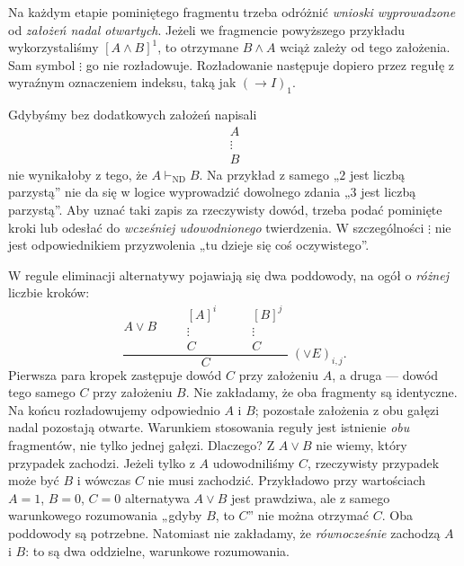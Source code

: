 \begin{uwaga}
Na każdym etapie pominiętego fragmentu trzeba odróżnić
\emph{wnioski wyprowadzone} od \emph{założeń nadal otwartych}.
Jeżeli we fragmencie powyższego przykładu wykorzystaliśmy
$[A\land B]^1$, to otrzymane $B\land A$ wciąż zależy
od tego założenia. Sam symbol $\vdots$ go nie rozładowuje.
Rozładowanie następuje dopiero przez regułę z wyraźnym
oznaczeniem indeksu, taką jak $(\to I)_1$.
\end{uwaga}

\begin{przyklad}
Gdybyśmy bez dodatkowych założeń napisali
\[
\begin{array}{c}
A\\
\vdots\\
B
\end{array}
\]
nie wynikałoby z tego, że $A\vdash_{\mathrm{ND}}B$.
Na przykład z samego „$2$ jest liczbą parzystą”
nie da się w logice wyprowadzić dowolnego zdania
„$3$ jest liczbą parzystą”. Aby uznać taki zapis
za rzeczywisty dowód, trzeba podać pominięte kroki
lub odesłać do \emph{wcześniej udowodnionego} twierdzenia.
W szczególności $\vdots$ nie jest odpowiednikiem
przyzwolenia „tu dzieje się coś oczywistego”.
\end{przyklad}

\begin{przyklad}
W regule eliminacji alternatywy pojawiają się dwa
poddowody, na ogół o \emph{różnej} liczbie kroków:
\[
\frac{A\lor B\qquad
  \begin{array}{c}[A]^i\\\vdots\\ C\end{array}
  \qquad
  \begin{array}{c}[B]^j\\\vdots\\ C\end{array}
}{C}\;(\lor E)_{i,j}.
\]
Pierwsza para kropek zastępuje dowód $C$ przy założeniu $A$,
a druga --- dowód tego samego $C$ przy założeniu $B$.
Nie zakładamy, że oba fragmenty są identyczne.
Na końcu rozładowujemy odpowiednio $A$ i $B$;
pozostałe założenia z obu gałęzi nadal pozostają otwarte.
Warunkiem stosowania reguły jest istnienie \emph{obu}
fragmentów, nie tylko jednej gałęzi.
Dlaczego? Z $A\lor B$ nie wiemy, który przypadek zachodzi.
Jeżeli tylko z $A$ udowodniliśmy $C$, rzeczywisty przypadek
może być $B$ i wówczas $C$ nie musi zachodzić.
Przykładowo przy wartościach $A=1$, $B=0$, $C=0$
alternatywa $A\lor B$ jest prawdziwa, ale z samego
warunkowego rozumowania „gdyby $B$, to $C$”
nie można otrzymać $C$. Oba poddowody są potrzebne.
Natomiast nie zakładamy, że \emph{równocześnie} zachodzą $A$ i $B$:
to są dwa oddzielne, warunkowe rozumowania.
\end{przyklad}


